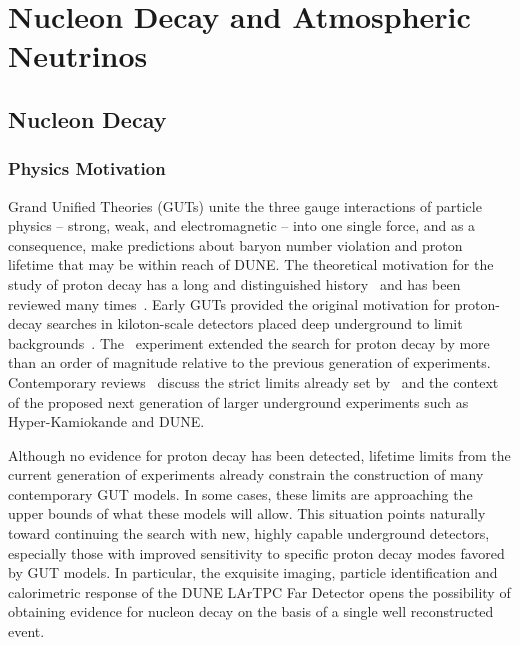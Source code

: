 \chapter{Nucleon Decay and Atmospheric Neutrinos}
\label{ch:physics-atmpdk}

\section{Nucleon Decay}
\label{sec:physics-atmpdk-ndk}

\subsection{Physics Motivation}
Grand Unified Theories (GUTs)  unite the three gauge interactions of particle 
physics -- strong, weak, and electromagnetic -- into one single force, and as a 
consequence, make predictions about  baryon number violation and proton lifetime that may be within reach of DUNE.  
%
The theoretical motivation for the study of proton decay has a long and
distinguished history~\cite{Pati:1973rp,Georgi:1974sy,Dimopoulos:1981dw} and
has been reviewed many times~\cite{Langacker:1980js,deBoer:1994dg,Nath:2006ut}.
%
Early GUTs provided the original motivation for proton-decay searches in
kiloton-scale detectors placed deep underground to limit backgrounds~\cite{homestake:depth}.  The
 \superk\ experiment extended the search for proton decay by more
than an order of magnitude relative to the previous generation of experiments.
%
Contemporary reviews~\cite{Raby:2008pd,Senjanovic:2009kr,Li:2010dp} discuss the
strict limits already set by \superk\ and the context of the proposed next
generation of larger underground
experiments such as Hyper-Kamiokande and DUNE.

Although no evidence for proton decay has been detected, lifetime
limits from the current generation of experiments already constrain
the construction of many contemporary GUT models. 
In some cases, these limits are approaching the upper bounds of what these models will allow.
This situation points naturally toward continuing 
the search with new, highly capable underground detectors, especially those 
with improved sensitivity to specific proton decay modes favored by GUT models.
In particular, the exquisite imaging, particle identification and calorimetric 
response of the DUNE LArTPC Far Detector opens the possibility of obtaining 
evidence for nucleon decay on the basis of a single well reconstructed event.


